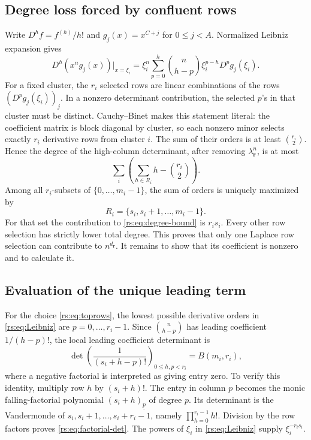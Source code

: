 \documentclass[11pt]{article}
\theoremstyle{definition}
\theoremstyle{remark}
\theoremstyle{definition}
\theoremstyle{plain}
\numberwithin{equation}{section}
\begin{document}
\subsection{Degree loss forced by confluent rows}
Write $D^h f=f^{(h)}/h!$ and $g_j(x)=x^{C+j}$ for $0\le j<A$.
Normalized Leibniz expansion gives
\begin{equation}
 D^h(x^n g_j(x))\big|_{x=\xi_i}
 =\xi_i^n\sum_{p=0}^{h}
       \binom{n}{h-p}\xi_i^{p-h}D^p g_j(\xi_i).
 \label{rs:eq:Leibniz}
\end{equation}
For a fixed cluster, the $r_i$ selected rows are linear combinations of the
rows $(D^p g_j(\xi_i))_j$. In a nonzero determinant contribution, the selected
$p$'s in that cluster must be distinct. Cauchy--Binet makes this statement
literal: the coefficient matrix is block diagonal by cluster, so each
nonzero minor selects exactly $r_i$ derivative rows from cluster $i$.
The sum of their orders is at least $\binom{r_i}{2}$. Hence the degree of
the high-column determinant, after removing $\lambda_{\boldsymbol r}^n$,
is at most
\begin{equation}
 \sum_i\left(\sum_{h\in R_i}h-\binom{r_i}{2}\right).
 \label{rs:eq:degree-bound}
\end{equation}
Among all $r_i$-subsets of $\{0,\ldots,m_i-1\}$, the sum of orders is
uniquely maximized by
\begin{equation}
 R_i=\{s_i,s_i+1,\ldots,m_i-1\}.
 \label{rs:eq:toprows}
\end{equation}
For that set the contribution to \eqref{rs:eq:degree-bound} is $r_i s_i$.
Every other row selection has strictly lower total degree. This proves that
only one Laplace row selection can contribute to $n^{d_{\boldsymbol r}}$.
It remains to show that its coefficient is nonzero and to calculate it.

\subsection{Evaluation of the unique leading term}
For the choice \eqref{rs:eq:toprows}, the lowest possible derivative orders
in \eqref{rs:eq:Leibniz} are $p=0,\ldots,r_i-1$. Since
$\binom n{h-p}$ has leading coefficient $1/(h-p)!$, the local leading
coefficient determinant is
\begin{equation}
 \det\left(\frac{1}{(s_i+h-p)!}\right)_{0\le h,p<r_i}
 =B(m_i,r_i),
 \label{rs:eq:factorial-det}
\end{equation}
where a negative factorial is interpreted as giving entry zero.
To verify this identity, multiply row $h$ by $(s_i+h)!$. The entry in
column $p$ becomes the monic falling-factorial polynomial
$(s_i+h)_{\underline p}$ of degree $p$. Its determinant is the Vandermonde
of $s_i,s_i+1,\ldots,s_i+r_i-1$, namely
$\prod_{h=0}^{r_i-1}h!$. Division by the row factors proves
\eqref{rs:eq:factorial-det}.
The powers of $\xi_i$ in \eqref{rs:eq:Leibniz} supply
$\xi_i^{-r_i s_i}$.
\end{document}
